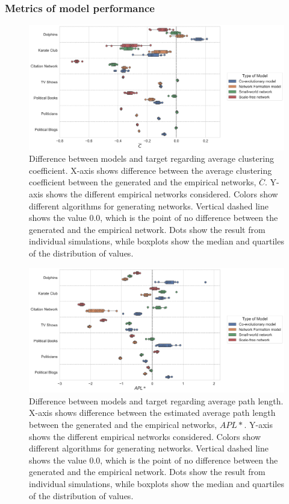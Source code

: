 \documentclass[11pt]{article}
\begin{document}
\subsubsection{Metrics of model performance}
\begin{figure}[H]
    \centering
    \includegraphics[width=.9\linewidth]{../plots/overall/Model_Evaluation_Average_Clustering.png}
  \caption{Difference between models and target regarding average clustering coefficient. X-axis shows difference between the average clustering coefficient between the generated and the empirical networks, $\overline{C}$. Y-axis shows the different empirical networks considered. Colors show different algorithms for generating networks. Vertical dashed line shows the value 0.0, which is the point of no difference between the generated and the empirical network. Dots show the result from individual simulations, while boxplots show the median and quartiles of the distribution of values.}
  \label{appendix:eval_clustering}
\end{figure}

\begin{figure}[H]
    \centering
    \includegraphics[width=.9\linewidth]{../plots/overall/Model_Evaluation_APL.png}
  \caption{Difference between models and target regarding average path length. X-axis shows difference between the estimated average path length between the generated and the empirical networks, $APL*$. Y-axis shows the different empirical networks considered. Colors show different algorithms for generating networks. Vertical dashed line shows the value 0.0, which is the point of no difference between the generated and the empirical network. Dots show the result from individual simulations, while boxplots show the median and quartiles of the distribution of values.}
  \label{appendix:eval_path}
\end{figure}
\end{document}
